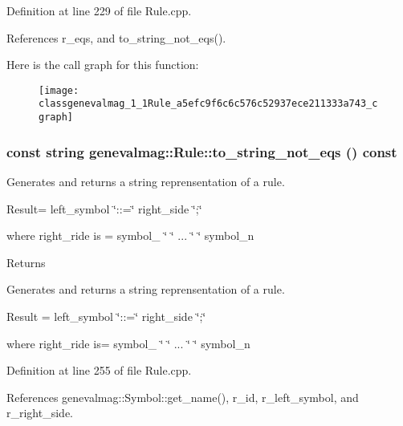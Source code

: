 Definition at line 229 of file Rule.cpp.



References r\_\-eqs, and to\_\-string\_\-not\_\-eqs().



Here is the call graph for this function:\nopagebreak
\begin{figure}[H]
\begin{center}
\leavevmode
\texttt{[image: classgenevalmag\_1\_1Rule\_a5efc9f6c6c576c52937ece211333a743\_cgraph]}
\end{center}
\end{figure}


\hypertarget{classgenevalmag_1_1Rule_ab29cbf1ccafc2585524ee9cdbe58362b}{
\subsubsection[{to\_\-string\_\-not\_\-eqs}]{\setlength{\rightskip}{0pt plus 5cm}const string genevalmag::Rule::to\_\-string\_\-not\_\-eqs () const}}
\label{classgenevalmag_1_1Rule_ab29cbf1ccafc2585524ee9cdbe58362b}
Generates and returns a string reprensentation of a rule.\par
 \par
 Result= left\_\-symbol \char`\"{}::=\char`\"{} right\_\-side \char`\"{};\char`\"{}\par
 \par
 where right\_\-ride is = symbol\_ \char`\"{} \char`\"{} ... \char`\"{} \char`\"{} symbol\_\-n\par
 \par
 \begin{DoxyReturn}{Returns}

\end{DoxyReturn}
Generates and returns a string reprensentation of a rule.

Result = left\_\-symbol \char`\"{}::=\char`\"{} right\_\-side \char`\"{};\char`\"{}

where right\_\-ride is= symbol\_ \char`\"{} \char`\"{} ... \char`\"{} \char`\"{} symbol\_\-n 

Definition at line 255 of file Rule.cpp.



References genevalmag::Symbol::get\_\-name(), r\_\-id, r\_\-left\_\-symbol, and r\_\-right\_\-side.



